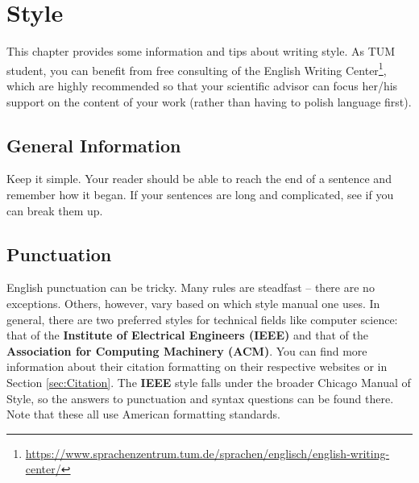 \chapter{Style} \label{ch:Style}
This chapter provides some information and tips about writing style.
As TUM student, you can benefit from free consulting of the English Writing
Center\footnote{\url{https://www.sprachenzentrum.tum.de/sprachen/englisch/english-writing-center/}}, which are highly recommended so that your
scientific advisor can focus her/his support on the content of your work (rather than having to polish language first).

\section{General Information}
Keep it simple.
Your reader should be able to reach the end of a sentence and remember how it began.
If your sentences are long and complicated, see if you can break them up.

\section{Punctuation}
English punctuation can be tricky.
Many rules are steadfast -- there are no exceptions.
Others, however, vary based on which style manual one uses.
In general, there are two preferred styles for technical fields like computer science: that of the \textbf{Institute of Electrical Engineers (IEEE)}
and that of the \textbf{Association for Computing Machinery (ACM)}.
You can find more information about their citation formatting on their respective websites or in Section \ref{sec:Citation}.
The \textbf{IEEE} style falls under the broader Chicago Manual of Style, so the answers to punctuation and syntax questions can be found there.
Note that these all use American formatting standards.


